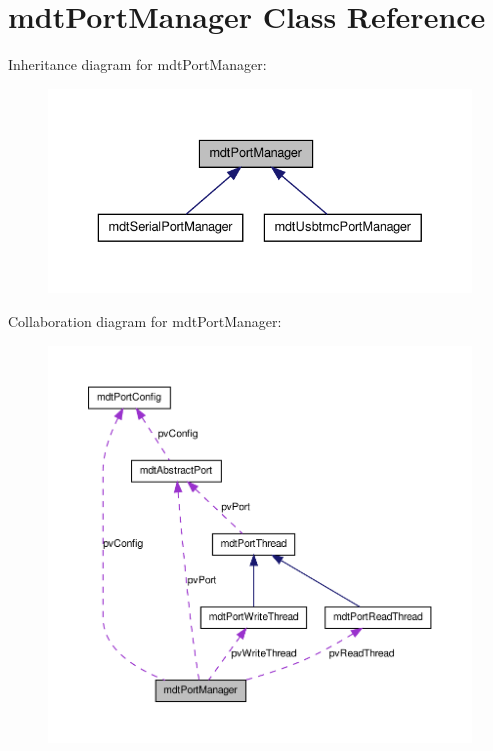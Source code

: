 \hypertarget{classmdt_port_manager}{
\section{mdtPortManager Class Reference}
\label{classmdt_port_manager}
}


Inheritance diagram for mdtPortManager:\nopagebreak
\begin{figure}[H]
\begin{center}
\leavevmode
\includegraphics[width=332pt]{classmdt_port_manager__inherit__graph}
\end{center}
\end{figure}


Collaboration diagram for mdtPortManager:
\nopagebreak
\begin{figure}[H]
\begin{center}
\leavevmode
\includegraphics[width=400pt]{classmdt_port_manager__coll__graph}
\end{center}
\end{figure}
